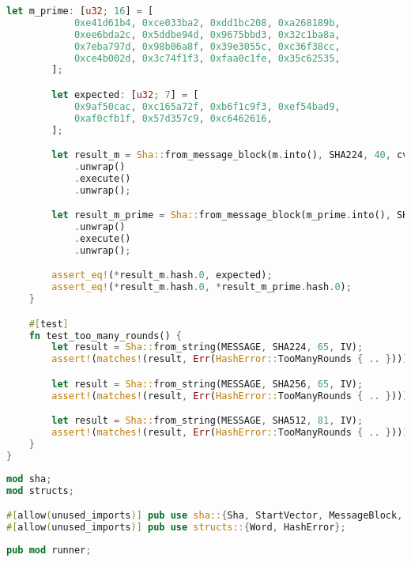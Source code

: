 \begin{lstlisting}[language=rust, caption={sha/sha.rs}]
		let m_prime: [u32; 16] = [
			0xe41d61b4, 0xce033ba2, 0xdd1bc208, 0xa268189b,
			0xee6bda2c, 0x5ddbe94d, 0x9675bbd3, 0x32c1ba8a,
			0x7eba797d, 0x98b06a8f, 0x39e3055c, 0xc36f38cc,
			0xce4b002d, 0x3c74f1f3, 0xfaa0c1fe, 0x35c62535,
		];

		let expected: [u32; 7] = [
			0x9af50cac, 0xc165a72f, 0xb6f1c9f3, 0xef54bad9,
			0xaf0cfb1f, 0x57d357c9, 0xc6462616,
		];

		let result_m = Sha::from_message_block(m.into(), SHA224, 40, cv)
			.unwrap()
			.execute()
			.unwrap();

		let result_m_prime = Sha::from_message_block(m_prime.into(), SHA224, 40, cv_prime)
			.unwrap()
			.execute()
			.unwrap();

		assert_eq!(*result_m.hash.0, expected);
		assert_eq!(*result_m.hash.0, *result_m_prime.hash.0);
	}

	#[test]
	fn test_too_many_rounds() {
		let result = Sha::from_string(MESSAGE, SHA224, 65, IV);
		assert!(matches!(result, Err(HashError::TooManyRounds { .. })));

		let result = Sha::from_string(MESSAGE, SHA256, 65, IV);
		assert!(matches!(result, Err(HashError::TooManyRounds { .. })));

		let result = Sha::from_string(MESSAGE, SHA512, 81, IV);
		assert!(matches!(result, Err(HashError::TooManyRounds { .. })));
	}
}
\end{lstlisting}

\begin{lstlisting}[language=rust, caption={sha/mod.rs}]
mod sha;
mod structs;

#[allow(unused_imports)] pub use sha::{Sha, StartVector, MessageBlock, OutputHash};
#[allow(unused_imports)] pub use structs::{Word, HashError};
\end{lstlisting}

\begin{lstlisting}[language=rust, caption={benchmark/mod.rs}]
pub mod runner;
\end{lstlisting}

